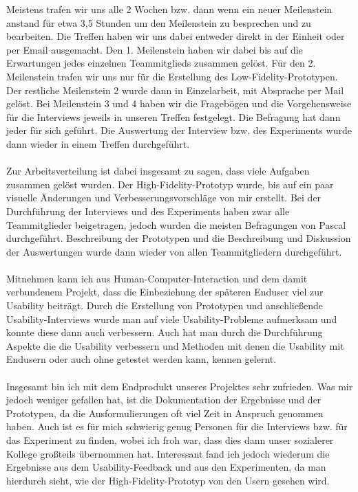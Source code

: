 \documentclass[a4paper,10pt]{scrartcl}
\begin{document}
Meistens trafen wir uns alle 2 Wochen bzw. dann wenn ein neuer Meilenstein anstand für etwa 3,5 Stunden um den Meilenstein zu besprechen und zu bearbeiten. Die Treffen haben wir uns
dabei entweder direkt in der Einheit oder per Email ausgemacht. Den 1. Meilenstein haben wir dabei bis auf die Erwartungen jedes einzelnen Teammitglieds zusammen gelöst.
Für den 2. Meilenstein trafen wir uns nur für die Erstellung des Low-Fidelity-Prototypen. Der restliche Meilenstein 2 wurde dann in Einzelarbeit, mit Absprache per Mail
gelöst. Bei Meilenstein 3 und 4 haben wir die Fragebögen und die Vorgehensweise für die Interviews
jeweils in unseren Treffen festgelegt. Die Befragung hat dann jeder für sich geführt. Die Auswertung der Interview bzw. des Experiments wurde dann wieder in einem Treffen
durchgeführt.
\\ \\
Zur Arbeitsverteilung ist dabei insgesamt zu sagen, dass viele Aufgaben zusammen gelöst wurden. Der High-Fidelity-Prototyp wurde, bis auf ein paar visuelle Änderungen
und Verbesserungsvorschläge von mir erstellt.
Bei der Durchführung der Interviews und des Experiments haben zwar alle Teammitglieder beigetragen, jedoch wurden die meisten Befragungen von Pascal durchgeführt. Beschreibung
der Prototypen und die Beschreibung und Diskussion der Auswertungen wurde dann wieder von allen Teammitgliedern durchgeführt.
\\ \\
Mitnehmen kann ich aus Human-Computer-Interaction und dem damit verbundenem Projekt, dass die Einbeziehung der späteren Enduser viel zur Usability beiträgt. Durch die Erstellung von Prototypen und anschließende Usability-Interviews wurde man auf viele Usability-Probleme aufmerksam und
konnte diese dann auch verbessern. Auch hat man durch die Durchführung Aspekte die die Usability verbessern und Methoden mit denen die Usability mit Endusern oder auch ohne
getestet werden kann, kennen gelernt.
\\ \\
Insgesamt bin ich mit dem Endprodukt unseres Projektes sehr zufrieden. Was mir jedoch weniger gefallen hat, ist die Dokumentation der Ergebnisse und der Prototypen, da
die Ausformulierungen oft viel Zeit in Anspruch genommen haben. Auch ist es für mich schwierig genug Personen für die Interviews bzw. für das Experiment zu finden, wobei
ich froh war, dass dies dann unser sozialerer Kollege großteils übernommen hat. Interessant fand ich jedoch wiederum die Ergebnisse aus dem Usability-Feedback und aus den Experimenten,
da man hierdurch sieht, wie der High-Fidelity-Prototyp von den Usern gesehen wird.
\end{document}
